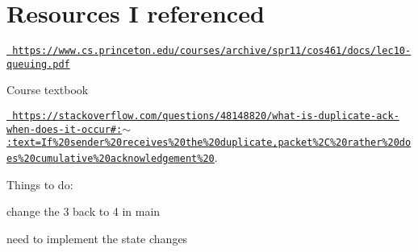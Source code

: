 \chapter{Resources I referenced}
\hypertarget{md__resources}{}\label{md__resources}
\label{md__resources_autotoc_md0}%
%

\begin{DoxyItemize}
\item \href{https://www.cs.princeton.edu/courses/archive/spr11/cos461/docs/lec10-queuing.pdf}{\texttt{ https\+://www.\+cs.\+princeton.\+edu/courses/archive/spr11/cos461/docs/lec10-\/queuing.\+pdf}}
\item Course textbook
\item \href{https://stackoverflow.com/questions/48148820/what-is-duplicate-ack-when-does-it-occur\#:~:text=If\%20sender\%20receives\%20the\%20duplicate,packet\%2C\%20rather\%20does\%20cumulative\%20acknowledgement\%20}{\texttt{ https\+://stackoverflow.\+com/questions/48148820/what-\/is-\/duplicate-\/ack-\/when-\/does-\/it-\/occur\#\+:\texorpdfstring{$\sim$}{\string~}\+:text=\+If\%20sender\%20receives\%20the\%20duplicate,packet\%2\+C\%20rather\%20does\%20cumulative\%20acknowledgement\%20}}.
\end{DoxyItemize}

Things to do\+:
\begin{DoxyItemize}
\item change the 3 back to 4 in main
\item need to implement the state changes 
\end{DoxyItemize}